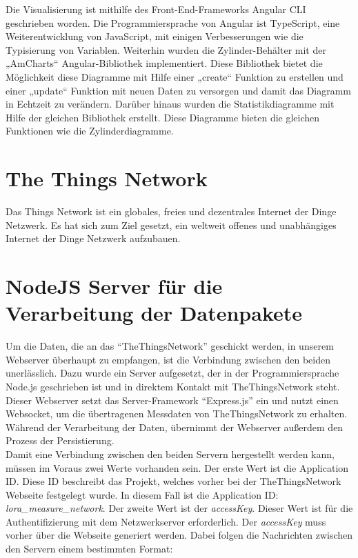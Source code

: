 \noindent
Die Visualisierung ist mithilfe des Front-End-Frameworks Angular CLI geschrieben worden. Die Programmiersprache von Angular ist TypeScript, eine Weiterentwicklung von JavaScript, mit einigen Verbesserungen wie die Typisierung von Variablen. Weiterhin wurden die Zylinder-Behälter mit der „AmCharts“ Angular-Bibliothek implementiert. Diese Bibliothek bietet die Möglichkeit diese Diagramme mit Hilfe einer „create“ Funktion zu erstellen und einer „update“ Funktion mit neuen Daten zu versorgen und damit das Diagramm in Echtzeit zu verändern. Darüber hinaus wurden die Statistikdiagramme mit Hilfe der gleichen Bibliothek erstellt. Diese Diagramme bieten die gleichen Funktionen wie die Zylinderdiagramme.

\section{The Things Network}
Das Things Network ist ein globales, freies und dezentrales Internet der Dinge Netzwerk. Es hat sich zum Ziel gesetzt, ein weltweit offenes und unabhängiges Internet der Dinge Netzwerk aufzubauen.

\section{NodeJS Server für die Verarbeitung der Datenpakete}
Um die Daten, die an das ``TheThingsNetwork'' geschickt werden, in unserem Webserver überhaupt zu empfangen, ist die Verbindung zwischen den beiden unerlässlich. Dazu wurde ein Server aufgesetzt, der in der Programmiersprache Node.js geschrieben ist und in direktem Kontakt mit TheThingsNetwork steht. Dieser Webserver setzt das Server-Framework ``Express.js'' ein und nutzt einen Websocket, um die übertragenen Messdaten von TheThingsNetwork zu erhalten. Während der Verarbeitung der Daten, übernimmt der Webserver außerdem den Prozess der Persistierung.\\

\noindent
Damit eine Verbindung zwischen den beiden Servern hergestellt werden kann, müssen im Voraus zwei Werte vorhanden sein. Der erste Wert ist die Application ID. Diese ID beschreibt das Projekt, welches vorher bei der TheThingsNetwork Webseite festgelegt wurde. In diesem Fall ist die Application ID: \textit{lora\_measure\_network}. Der zweite Wert ist der \textit{accessKey}. Dieser Wert ist für die Authentifizierung mit dem Netzwerkserver erforderlich. Der \textit{accessKey} muss vorher über die Webseite generiert werden. Dabei folgen die Nachrichten zwischen den Servern einem bestimmten Format:\\


